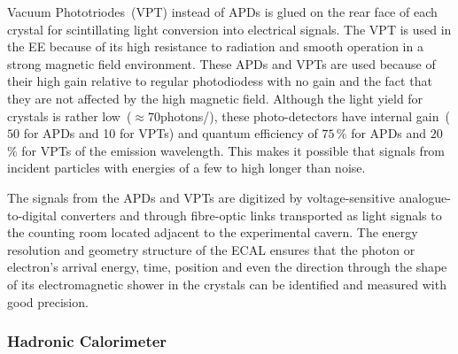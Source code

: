 Vacuum Phototriodes~(VPT) instead of APDs is glued on the rear face of each crystal for scintillating light  conversion into electrical signals. The VPT is used in the \textsc{EE} because of its high resistance to radiation and smooth operation in a strong magnetic field environment. These APDs and VPTs are used because of their high gain relative to regular photodiodess with no gain and the fact that they are not affected by the high magnetic field. Although the light yield for \pb crystals is rather low~($\approx 70$photons/\MeV), these photo-detectors have internal gain~($50$ for APDs and 10 for VPTs) and quantum efficiency of $75$\,\% for APDs and $20$\,\% for VPTs of the emission wavelength. This makes it possible that signals from incident particles with energies of a few to high \GeV longer than noise.
 
The signals from the APDs and VPTs are digitized by voltage-sensitive analogue-to-digital converters and through fibre-optic links transported as light signals to the counting room located adjacent to the experimental cavern.
\newline
The energy resolution and geometry structure of the ECAL ensures that the photon or electron's arrival energy, time, position and even the direction through the shape of its electromagnetic shower in the crystals can be identified and measured with good precision.

\subsubsection{Hadronic Calorimeter}

